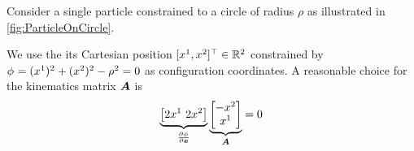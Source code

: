 % 

\clearpage

\begin{Example}
Consider a single particle constrained to a circle of radius $\rho$ as illustrated in \autoref{fig:ParticleOnCircle}.

\begin{minipage}{\textwidth}
 \centering
 
 \label{fig:ParticleOnCircle}
\end{minipage}

We use the its Cartesian position $[\sysCoordCoeff{1}, \sysCoordCoeff{2}]^\top \in \RealNum^2$ constrained by $\geoConstraintCoeff{} = (\sysCoordCoeff{1})^2 + (\sysCoordCoeff{2})^2 - \rho^2 = 0$ as configuration coordinates.
A reasonable choice for the kinematics matrix $\kinMat$ is
\begin{align}
 \underbrace{\big[ 2\sysCoordCoeff{1} \ 2\sysCoordCoeff{2} \big]}_{\pdiff[\geoConstraintCoeff{}]{\sysCoord}}
 \underbrace{\begin{bmatrix} -\sysCoordCoeff{2} \\ \sysCoordCoeff{1} \end{bmatrix}}_{\kinMat}
 = 0
\end{align}
\end{Example}
\vfill

